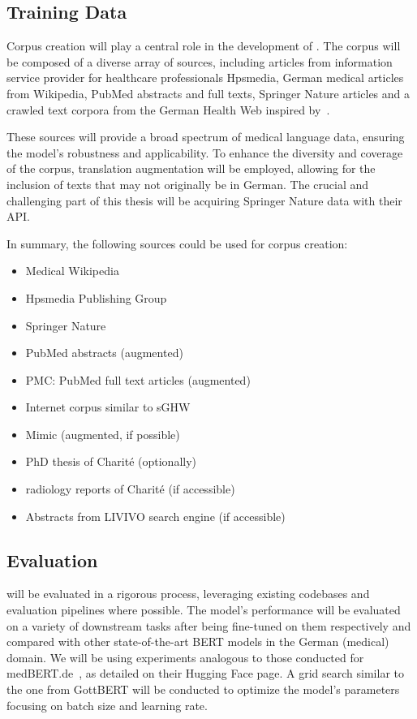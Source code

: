 \subsection*{Training Data}

Corpus creation will play a central role in the development of \ChristBERT{}. The
corpus will be composed of a diverse array of sources, including articles from
information service provider for healthcare professionals Hpsmedia, German
medical articles from Wikipedia, PubMed abstracts and full texts, Springer
Nature articles and a crawled text corpora from the German Health Web inspired
by~\cite{zowalla2020crawling}. 

These sources will provide a broad spectrum of medical language data, ensuring
the model's robustness and applicability. To enhance the diversity and coverage
of the corpus, translation augmentation will be employed, allowing for the
inclusion of texts that may not originally be in German. The crucial and
challenging part of this thesis will be acquiring Springer Nature data with
their API.

In summary, the following sources could be used for corpus creation:

\begin{itemize}
    \item Medical Wikipedia
    \item Hpsmedia Publishing Group
    \item Springer Nature
    \item PubMed abstracts (augmented)
    \item PMC: PubMed full text articles (augmented)
    \item Internet corpus similar to sGHW~\cite{zowalla2020crawling}
    \item Mimic (augmented, if possible)
    \item PhD thesis of Charité (optionally)
    \item radiology reports of Charité (if accessible)
    \item Abstracts from LIVIVO search engine (if accessible)
\end{itemize}

\subsection*{Evaluation}

\ChristBERT{} will be evaluated in a rigorous process, leveraging existing
codebases and evaluation pipelines where possible. The model's performance will
be evaluated on a variety of downstream tasks after being fine-tuned on them
respectively and compared with other state-of-the-art BERT models in the German
(medical) domain. We will be using experiments analogous to those conducted for
medBERT.de~\cite{bressem2024medbert}, as detailed on their Hugging Face page. A
grid search similar to the one from GottBERT will be conducted to optimize the
model's parameters focusing on batch size and learning rate. 

